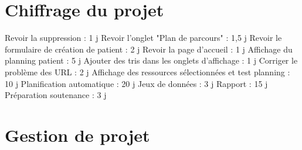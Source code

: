 \documentclass{polytech/polytech}
\begin{document}
\chapter{Chiffrage du projet}
\label{ann:chiffrage}

Revoir la suppression : 1 j
Revoir l'onglet "Plan de parcours" : 1,5 j
Revoir le formulaire de création de patient : 2 j
Revoir la page d'accueil : 1 j
Affichage du planning patient : 5 j
Ajouter des tris dans les onglets d'affichage : 1 j
Corriger le problème des URL : 2 j
Affichage des ressources sélectionnées et test planning : 10 j
Planification automatique : 20 j
Jeux de données : 3 j
Rapport : 15 j
Préparation soutenance : 3 j

\chapter{Gestion de projet}
\label{ann:gestion}

\end{document}
